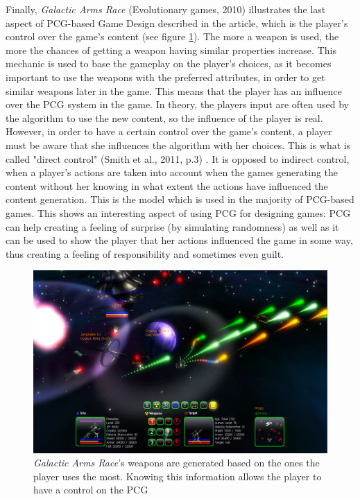 Finally, \textit{Galactic Arms Race} (Evolutionary games, 2010) \cite{game:gar} illustrates the last aspect of PCG-based Game Design described in the article, which is the player's control over the game's content (see figure \ref{fig:GAR}). The more a weapon is used, the more the chances of getting a weapon having similar properties increase. This mechanic is used to base the gameplay on the player's choices, as it becomes important to use the weapons with the preferred attributes, in order to get similar weapons later in the game. This means that the player has an influence over the PCG system in the game. In theory, the players input are often used by the algorithm to use the new content, so the influence of the player is real. However, in order to have a certain control over the game's content, a player must be aware that she influences the algorithm with her choices. This is what is called "direct control" (Smith et al., 2011, p.3) \cite{pdf:pcgbased}. It is opposed to indirect control, when a player's actions are taken into account when the games generating the content without her knowing in what extent the actions have influenced the content generation. This is the model which is used in the majority of PCG-based games. This shows an interesting aspect of using PCG for designing games: PCG can help creating a feeling of surprise (by simulating randomness) as well as it can be used to show the player that her actions influenced the game in some way, thus creating a feeling of responsibility and sometimes even guilt.

\begin{figure}[!ht]
    \centering
    \includegraphics[scale=0.2]{Images/GAR.jpg}
    \caption{\textit{Galactic Arms Race}'s weapons are generated based on the ones the player uses the most. Knowing this information allows the player to have a control on the PCG}
    \label{fig:GAR}
\end{figure}

